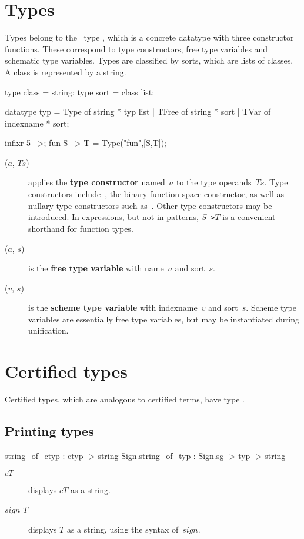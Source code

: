 \section{Types} 
Types belong to the \ML\ type , which is a concrete
datatype with three constructor functions.  These correspond to type
constructors, free type variables and schematic type variables.  Types are
classified by sorts, which are lists of classes.  A class is represented by
a string.
\begin{ttbox}
type class = string;
type sort  = class list;

datatype typ = Type  of string * typ list
             | TFree of string * sort
             | TVar  of indexname * sort;

infixr 5 -->;
fun S --> T = Type("fun",[S,T]);
\end{ttbox}
\begin{description}
\item[($a$, $Ts$)] 
applies the {\bf type constructor} named~$a$ to the type operands~$Ts$.
Type constructors include~, the binary function space
constructor, as well as nullary type constructors such
as~.  Other type constructors may be introduced.  In
expressions, but not in patterns, \hbox{\tt$S$-->$T$} is a convenient
shorthand for function types.

\item[($a$, $s$)] 
is the {\bf free type variable} with name~$a$ and sort~$s$.

\item[($v$, $s$)] 
is the {\bf scheme type variable} with indexname~$v$ and sort~$s$.  Scheme
type variables are essentially free type variables, but may be instantiated
during unification.
\end{description}


\section{Certified types}
Certified types, which are analogous to certified terms, have type 
.

\subsection{Printing types}
\begin{ttbox} 
     string_of_ctyp :           ctyp -> string
Sign.string_of_typ  : Sign.sg -> typ -> string
\end{ttbox}
\begin{description}
\item[ $cT$] 
displays $cT$ as a string.

\item[ $sign$ $T$] 
displays $T$ as a string, using the syntax of~$sign$.
\end{description}


